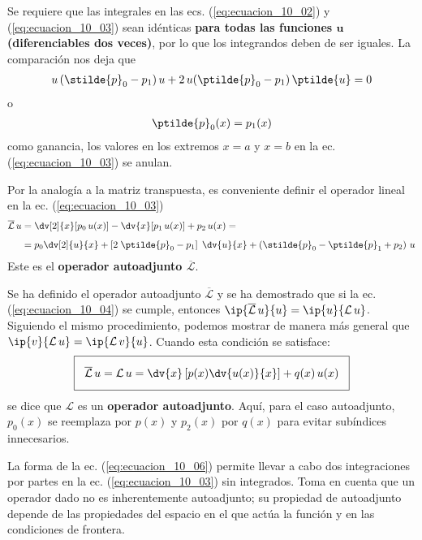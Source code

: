 Se requiere que las integrales en las ecs. (\ref{eq:ecuacion_10_02}) y (\ref{eq:ecuacion_10_03}) sean idénticas \textbf{para todas las funciones $\bm{u}$ (diferenciables dos veces)}, por lo que los integrandos deben de ser iguales. La comparación nos deja que
\begin{align*}
u \, (\stilde{p}_{0} - p_{1}) \, u + 2 \, u (\ptilde{p}_{0} - p_{1}) \, \ptilde{u} = 0
\end{align*}
o
\begin{align}
\ptilde{p}_{0} (x) = p_{1} (x)
\label{eq:ecuacion_10_04}
\end{align}
como ganancia, los valores en los extremos $x = a$ y $x = b$ en la ec. (\ref{eq:ecuacion_10_03}) se anulan.
\par
Por la analogía a la matriz transpuesta, es conveniente definir el operador lineal en la ec. (\ref{eq:ecuacion_10_03})
\begin{align}
\begin{aligned}[b]
\overline{\mathcal{L}} \, u &= \dv[2]{x} [ p_{0} \, u(x)] - \dv{x} [p_{1} \, u(x)] + p_{2} \, u(x) = \\[0.5em]
&= p_{0} \dv[2]{u}{x} + \left[ 2 \; \ptilde{p}_{0} - p_{1} \right] \; \dv{u}{x} + \left( \stilde{p}_{0} - \ptilde{p}_{1} + p_{2} \right) \, u
\label{eq:ecuacion_10_05}
\end{aligned}
\end{align}
Este es el \textbf{operador autoadjunto $\overline{\mathcal{L}}$}.
\par 
Se ha definido el operador autoadjunto $\overline{\mathcal{L}}$ y se ha demostrado que si la ec. (\ref{eq:ecuacion_10_04}) se cumple, entonces $\ip{\overline{\mathcal{L}} \, u}{u} = \ip{u}{\mathcal{L} \, u}$. Siguiendo el mismo procedimiento, podemos mostrar de manera más general que $\ip{v}{\mathcal{L} \, u} = \ip{\mathcal{L} \, v}{u}$. Cuando esta condición se satisface:
\begin{equation}
\setlength{\fboxsep}{3\fboxsep}\boxed{\overline{\mathcal{L}} \, u = \mathcal{L} \, u = \dv{x} \left[ p(x) \dv{u(x)}{x} \right] + q(x) \, u(x)}
\label{eq:ecuacion_10_06}
\end{equation}
se dice que $\mathcal{L}$ es un \textbf{operador autoadjunto}. Aquí, para el caso autoadjunto, $p_{0}(x)$ se reemplaza por $p(x)$ y $p_{2}(x)$ por $q(x)$ para evitar subíndices innecesarios.
\par
La forma de la ec. (\ref{eq:ecuacion_10_06}) permite llevar a cabo dos integraciones por partes en la ec. (\ref{eq:ecuacion_10_03}) sin integrados. Toma en cuenta que un operador dado no es inherentemente autoadjunto; su propiedad de autoadjunto depende de las propiedades del espacio en el que actúa la función y en las condiciones de frontera.
